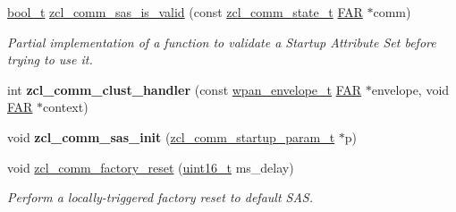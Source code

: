 \begin{DoxyCompactItemize}
\item 
\hyperlink{group__hal_ga04dd5074964518403bf944f2b240a5f8}{bool\-\_\-t} \hyperlink{group__zcl__commissioning_ga91a578cd65163c738bd57a4249955c05}{zcl\-\_\-comm\-\_\-sas\-\_\-is\-\_\-valid} (const \hyperlink{structzcl__comm__state__t}{zcl\-\_\-comm\-\_\-state\-\_\-t} \hyperlink{group__hal_gaef060b3456fdcc093a7210a762d5f2ed}{F\-A\-R} $\ast$comm)
\begin{DoxyCompactList}\small\item\em Partial implementation of a function to validate a Startup Attribute Set before trying to use it. \end{DoxyCompactList}\item 
\hypertarget{group__zcl__commissioning_ga07258712d6ad21e9ddb96069bb08c896}{int {\bfseries zcl\-\_\-comm\-\_\-clust\-\_\-handler} (const \hyperlink{structwpan__envelope__t}{wpan\-\_\-envelope\-\_\-t} \hyperlink{group__hal_gaef060b3456fdcc093a7210a762d5f2ed}{F\-A\-R} $\ast$envelope, void \hyperlink{group__hal_gaef060b3456fdcc093a7210a762d5f2ed}{F\-A\-R} $\ast$context)}\label{group__zcl__commissioning_ga07258712d6ad21e9ddb96069bb08c896}

\item 
\hypertarget{group__zcl__commissioning_gae85ac833a5eaf6f4a8cb6a5a9e6bb49e}{void {\bfseries zcl\-\_\-comm\-\_\-sas\-\_\-init} (\hyperlink{structzcl__comm__startup__param__t}{zcl\-\_\-comm\-\_\-startup\-\_\-param\-\_\-t} $\ast$p)}\label{group__zcl__commissioning_gae85ac833a5eaf6f4a8cb6a5a9e6bb49e}

\item 
void \hyperlink{group__zcl__commissioning_ga1fb799391c7d917facd792d57e3db0fe}{zcl\-\_\-comm\-\_\-factory\-\_\-reset} (\hyperlink{group__hal_ga5a8b2dc9e45a9ee81a94ef304fb62505}{uint16\-\_\-t} ms\-\_\-delay)
\begin{DoxyCompactList}\small\item\em Perform a locally-\/triggered factory reset to default S\-A\-S. \end{DoxyCompactList}\end{DoxyCompactItemize}
